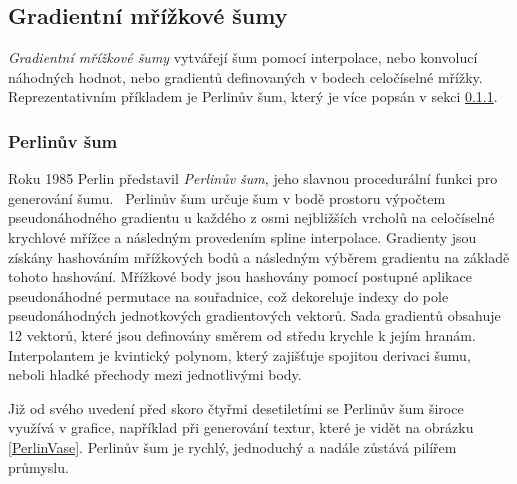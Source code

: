 \subsection{Gradientní mřížkové šumy}
\label{LatticeNoises}
\textit{Gradientní mřížkové šumy} vytvářejí šum pomocí interpolace, nebo konvolucí náhodných hodnot, nebo gradientů definovaných v bodech celočíselné mřížky. Reprezentativním příkladem je Perlinův šum, který je více popsán v sekci \ref{perlinNoise}. \cite{Lagae10}

\subsubsection{Perlinův šum}
\label{perlinNoise}
Roku 1985 Perlin představil \textit{Perlinův šum}, jeho slavnou procedurální funkci pro generování šumu.~\cite{PerlinKen, Perlin2002ImprovingN} Perlinův šum určuje šum v bodě prostoru výpočtem pseudonáhodného gradientu u každého z osmi nejbližších vrcholů na celočíselné krychlové mřížce a následným provedením spline interpolace. Gradienty jsou získány hashováním mřížkových bodů a následným výběrem gradientu na základě tohoto hashování. Mřížkové body jsou hashovány pomocí postupné aplikace pseudonáhodné permutace na souřadnice, což dekoreluje indexy do pole pseudonáhodných jednotkových gradientových vektorů. Sada gradientů obsahuje 12 vektorů, které jsou definovány směrem od středu krychle k jejím hranám. Interpolantem je kvintický polynom, který zajišťuje spojitou derivaci šumu, neboli hladké přechody mezi jednotlivými body.

Již od svého uvedení před skoro čtyřmi desetiletími se Perlinův šum široce využívá v grafice, například při generování textur, které je vidět na obrázku \ref{PerlinVase}. Perlinův šum je rychlý, jednoduchý a nadále zůstává pilířem průmyslu.

